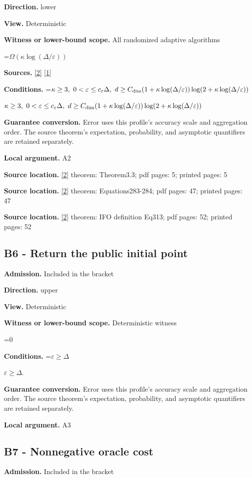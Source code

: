 \documentclass[10pt,a4paper]{article}
\newcommand{\AtlasMath}[1]{\par\begingroup\centering\setbox0=\hbox{$\displaystyle #1$}\ifdim\wd0>1.4\linewidth\typeout{ATLAS WIDE FORMULA: \the\wd0}\fi\ifdim\wd0>\linewidth\resizebox{\linewidth}{!}{\box0}\else\box0\fi\par\endgroup}
\newcommand{\AtlasInlineMath}[1]{\begingroup\setbox0=\hbox{$#1$}\ifdim\wd0>.4\linewidth\endgroup\AtlasMath{#1}\else\endgroup$#1$\fi}
\begin{document}
\textbf{Direction.} lower

\textbf{View.} Deterministic

\textbf{Witness or lower-bound scope.} All randomized adaptive algorithms

\AtlasMath{\Omega(\kappa\log(\Delta/\varepsilon))}
\textbf{Sources.} \href{https://arxiv.org/html/2609.00045v3}{[2]} \href{https://arxiv.org/html/2610.00345v1}{[1]}

\textbf{Conditions.} \AtlasInlineMath{\kappa\ge3,\ 0<\varepsilon\le c_\varepsilon\Delta,\ d\ge C_{\rm dim}(1+\kappa\log(\Delta/\varepsilon))\log(2+\kappa\log(\Delta/\varepsilon))}

\textbf{Guarantee conversion.} Error uses this profile's accuracy scale and aggregation order. The source theorem's expectation, probability, and asymptotic quantifiers are retained separately.

\textbf{Local argument.} A2

\textbf{Source location.} \href{https://arxiv.org/html/2609.00045v3}{[2]} theorem: Theorem3.3; pdf pages: 5; printed pages: 5

\textbf{Source location.} \href{https://arxiv.org/html/2609.00045v3}{[2]} theorem: Equations283-284; pdf pages: 47; printed pages: 47

\textbf{Source location.} \href{https://arxiv.org/html/2609.00045v3}{[2]} theorem: IFO definition Eq313; pdf pages: 52; printed pages: 52

\subsection{B6 - Return the public initial point}
\textbf{Admission.} Included in the bracket

\textbf{Direction.} upper

\textbf{View.} Deterministic

\textbf{Witness or lower-bound scope.} Deterministic witness

\AtlasMath{0}
\textbf{Conditions.} \AtlasInlineMath{\varepsilon\ge\Delta}.

\textbf{Guarantee conversion.} Error uses this profile's accuracy scale and aggregation order. The source theorem's expectation, probability, and asymptotic quantifiers are retained separately.

\textbf{Local argument.} A3

\subsection{B7 - Nonnegative oracle cost}
\textbf{Admission.} Included in the bracket
\end{document}
